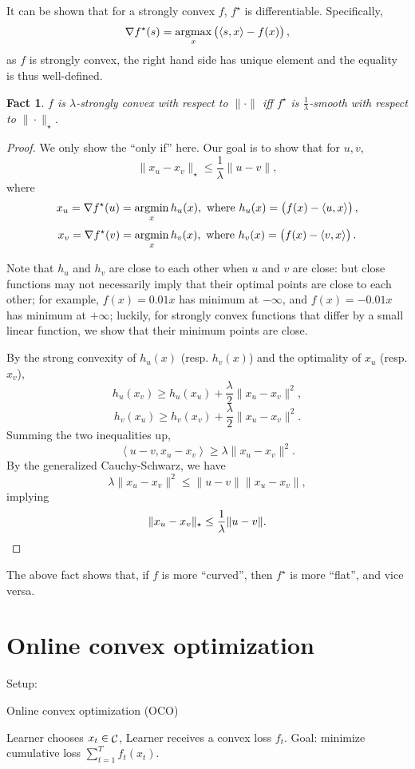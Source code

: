 \documentclass{article}
\newtheorem{fact}{Fact}
\DeclareMathOperator*{\Ccal}{{\cal C}}
\DeclareMathOperator*{\argmin}{{\rm argmin}}
\DeclareMathOperator*{\argmax}{{\rm argmax}}
\newcommand{\inner}[2]{\left\langle #1,#2 \right\rangle}
\begin{document}
It can be shown that for a strongly convex $f$, $f^\star$ is differentiable. Specifically,
\[ \nabla f^\star(s) = \argmax_{x} \del{\inner{s}{x} - f(x)}, \]
as $f$ is strongly convex, the right hand side has unique element and the equality
is thus well-defined.


\begin{fact}
$f$ is $\lambda$-strongly convex with respect to $\| \cdot \|$ iff $f^\star$ is $\frac1\lambda$-smooth with respect to $\| \cdot \|_\star$.
\label{fact:sc-sm}
\end{fact}
\begin{proof}
We only show the ``only if'' here. Our goal is to show that for $u, v$,
\[ \| x_u - x_v \|_\star \leq \frac1\lambda \| u - v\|, \]
where
\[ x_u = \nabla f^\star(u) = \argmin_x h_u(x), \text{ where } h_u(x) = \del{f(x) - \inner{u}{x}} , \]
\[ x_v = \nabla f^\star(v) = \argmin_x h_v(x), \text{ where } h_v(x) = \del{f(x) - \inner{v}{x}} . \]

Note that $h_u$ and $h_v$ are close to each other when $u$ and $v$ are close: but close functions may not necessarily imply that their optimal points are close to each other; for example, $f(x) = 0.01x$ has minimum at $-\infty$, and
$f(x) = -0.01x$ has minimum at $+\infty$; luckily, for strongly convex functions that differ by a small linear function, we show that their minimum points are close.

By the strong convexity of $h_u(x)$ (resp. $h_v(x)$) and the optimality of $x_u$ (resp. $x_v$),
\[ h_u(x_v) \geq h_u(x_u) + \frac{\lambda}{2} \| x_u - x_v \|^2, \]
\[ h_v(x_u) \geq h_v(x_v) + \frac{\lambda}{2} \| x_u - x_v \|^2. \]
Summing the two inequalities up,
\[ \inner{u - v}{x_u - x_v} \geq \lambda \| x_u - x_v \|^2. \]
By the generalized Cauchy-Schwarz, we have
\[ \lambda \| x_u - x_v \|^2 \leq \| u -v \| \| x_u - x_v \|, \]
implying
\[ \| x_u - x_v \|_\star \leq \frac1\lambda \| u - v \|. \qedhere\]
\end{proof}

The above fact shows that, if $f$ is more ``curved'', then $f^\star$ is more ``flat'', and vice versa.

\section{Online convex optimization}

Setup:
\begin{algorithm}
\caption{Online convex optimization (OCO)}
\begin{algorithmic}
\REQUIRE{Convex decision set $\Ccal$.}
\STATE Learner chooses $x_t \in \Ccal$,
\STATE Learner receives a convex loss $f_t$.
\ENDFOR
\STATE Goal: minimize cumulative loss $\sum_{t=1}^T f_t(x_t)$.
\end{algorithmic}
\end{algorithm}
\end{document}
